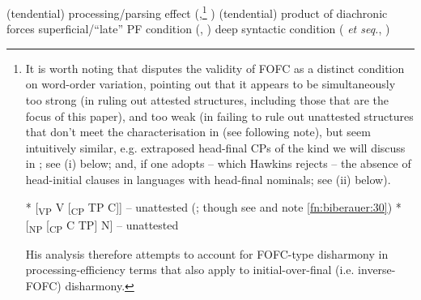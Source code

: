 \documentclass[output=paper]{LSP/langsci}
\begin{document}
\ea%
\label{ex:biberauer:10}
\ea \label{ex:biberauer:10a} (tendential) processing/parsing effect (\citealt{Cecchetto2013, Hawkins2013},\footnote{It is worth noting that \citet{Hawkins2013} disputes the validity of FOFC as a distinct condition on word-order variation, pointing out that it appears to be simultaneously too strong (in ruling out attested structures, including those that are the focus of this paper), and too weak (in failing to rule out unattested structures that don’t meet the characterisation in  (see following note), but seem intuitively similar, e.g. extraposed head-final CPs of the kind we will discuss in ; see (i) below; and, if one adopts  – which Hawkins rejects – the absence of head-initial  clauses in languages with head-final nominals; see (ii) below). 
\begin{exe}
 * [\textsubscript{VP} V [\textsubscript{CP} TP C]]  – unattested (\citealt{Hawkins1990}; though see  and note \ref{fn:biberauer:30})
 * [\textsubscript{NP}  [\textsubscript{CP} C TP] N] – unattested \citep{Lehmann1984}
\end{exe}
His analysis therefore attempts to account for FOFC-type disharmony in processing-efficiency terms that also apply to initial-over-final (i.e. inverse-FOFC) disharmony.} \citealt{Philip2013,Mobbs2015})  
\ex \label{ex:biberauer:10b}  (tendential) product of diachronic forces \citep{Whitman2013}
\ex \label{ex:biberauer:10c}  superficial/“late” PF condition (\citealt{Sheehan2013fofc,Richards2016}, \citealt{EtxepareHaddicanTV})
\ex \label{ex:biberauer:10d}  deep syntactic condition (\citealt{biberaueretal2009} \textit{et seq.}, \citealt{Cecchetto2013})
\z
\z
 
\end{document}

